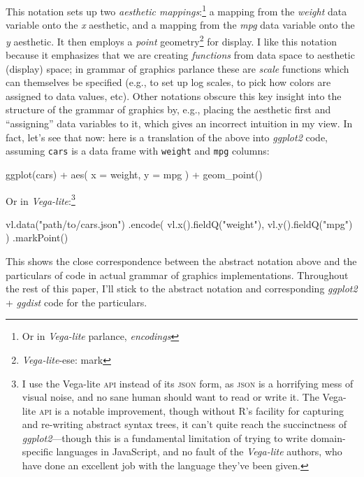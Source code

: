 \documentclass[journal]{vgtc}                     %
\newenvironment{centerverbatim}{%
  \hfill\break
  \small
  \centering
  \varwidth{\linewidth}%
  \verbatim
}{%
  \endverbatim
  \endvarwidth
  \par
  \hfill\break
}
\begin{document}
This notation sets up two \textit{aesthetic mappings}:\footnote{Or in \textit{Vega-lite} parlance, \textit{encodings}} a mapping from the \textit{weight} data variable onto the \textit{x} aesthetic, and a mapping from the \textit{mpg} data variable onto the \textit{y} aesthetic. It then employs a \textit{point} geometry\footnote{\textit{Vega-lite}-ese: mark} for display. I like this notation because it emphasizes that we are creating \textit{functions} from data space to aesthetic (display) space; in grammar of graphics parlance these are \textit{scale} functions which can themselves be specified (e.g., to set up log scales, to pick how colors are assigned to data values, etc). Other notations obscure this key insight into the structure of the grammar of graphics by, e.g., placing the aesthetic first and ``assigning'' data variables to it, which gives an incorrect intuition in my view. In fact, let's see that now: here is a translation of the above into \textit{ggplot2} code, assuming \texttt{cars} is a data frame with \texttt{weight} and \texttt{mpg} columns:

\begin{centerverbatim}
ggplot(cars) +
  aes(
    x = weight,
    y = mpg
  ) +
  geom_point()
\end{centerverbatim}

Or in \textit{Vega-lite}:\footnote{I use the Vega-lite \textsc{api} instead of its \textsc{json} form, as \textsc{json} is a horrifying mess of visual noise, and no sane human should want to read or write it. The Vega-lite \textsc{api} is a notable improvement, though without R's facility for capturing and re-writing abstract syntax trees, it can't quite reach the succinctness of \textit{ggplot2}---though this is a fundamental limitation of trying to write domain-specific languages in JavaScript, and no fault of the \textit{Vega-lite} authors, who have done an excellent job with the language they've been given.}

\begin{centerverbatim}
vl.data("path/to/cars.json")
  .encode(
    vl.x().fieldQ("weight"),
    vl.y().fieldQ("mpg")
  )
  .markPoint()
\end{centerverbatim}

This shows the close correspondence between the abstract notation above and the particulars of code in actual grammar of graphics implementations. Throughout the rest of this paper, I'll stick to the abstract notation and corresponding \textit{ggplot2} + \textit{ggdist} code for the particulars.
\end{document}
